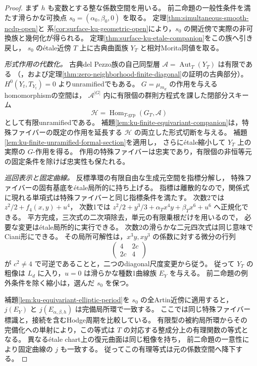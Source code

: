 \begin{proof}
まず $h$ も変数とする整な係数空間を用いる。
前二命題の一般性条件を満たす滑らかな可換点 $s_0=(\alpha_0,\beta_0,0)$ を取る。
定理\ref{thm:simultaneous-smooth-ncdp-open}と
系\ref{cor:surface-ku-geometric-open}により，$s_0$ の開近傍で実際の非可換族と幾何化が得られる。
定理\ref{thm:surface-ku-etale-companion}をこの族へ引き戻し，
$s_0$ の\'{e}tale近傍 $T$ 上に古典曲面族 $Y_T$ と相対Morita同値を取る。

\emph{形式作用の代数化。}
古典del Pezzo族の自己同型層 $\mathcal A=\operatorname{Aut}_T(Y_T)$ は有限である
（\cite[定理9.2]{PoissonDP}，および定理\ref{thm:zero-neighborhood-finite-diagonal}の証明の古典部分）。
$H^0(Y_t,T_{Y_t})=0$ よりunramifiedでもある。
$G=\mu_{m_d}$ の作用を与えるhomomorphismの空間は，
$\mathcal A^{|G|}$ 内に有限個の群則方程式を課した閉部分スキーム
\[
 \mathcal H=\operatorname{Hom}_{T\text{-grp}}(G_T,\mathcal A)
\]
として有限unramifiedである。
補題\ref{lem:ku-finite-equivariant-companion}は，特殊ファイバーの既定の作用を延長する
$\mathcal H$ の両立した形式切断を与える。
補題\ref{lem:ku-finite-unramified-formal-section}を適用し，
さらに\'{e}tale縮小して $Y_T$ 上の実際の $G$-作用を得る。
作用の特殊ファイバーは忠実であり，有限個の非恒等元の固定条件を除けば忠実性も保たれる。

\emph{巡回表示と固定曲線。}
反標準環の有限自由な生成元空間を指標分解し，
特殊ファイバーの固有基底を\'{e}tale局所的に持ち上げる。
指標は離散的なので，関係式に現れる単項式は特殊ファイバーと同じ指標条件を満たす。
次数2では $z^2/2+f_4(x,y)+u^4$，
次数1では $z^2/2+y^3/3+\alpha_Tx^4y+\beta_Tx^6+u^6$ へ正規化できる。
平方完成，三次式の二次項除去，単元の有限乗根だけを用いるので，
必要な変更は\'{e}tale局所的に実行できる。
次数2の滑らかな二元四次式は同じ意味でCiani形にできる。
その局所可解性は，$x^3y,xy^3$ の係数に対する微分の行列
\[
 \begin{pmatrix}4&2c\\2c&4\end{pmatrix}
\]
が $c^2\ne4$ で可逆であることと，二つのdiagonal尺度変更から従う。
従って $Y_T$ の粗像は $L_d$ に入り，$u=0$ は滑らかな種数1曲線族 $E_Y$ を与える。
前二命題の例外条件を除く縮小は，選んだ $s_0$ を保つ。

補題\ref{lem:ku-equivariant-elliptic-period}を $s_0$ の全Artin近傍に適用すると，
$j(E_Y)$ と $j(E_{\alpha,\beta,h})$ は完備局所環で一致する。
ここでは同じ特殊ファイバー標識と，接続を含むHodge周期を比較している。
有限型の被約局所環からその完備化への単射により，この等式は
$T$ の対応する整成分上の有理関数の等式となる。
異なる\'{e}tale chart上の復元曲面は同じ粗像を持ち，
前二命題の一意性により固定曲線の $j$ も一致する。
従ってこの有理等式は元の係数空間へ降下する。


\end{proof}
